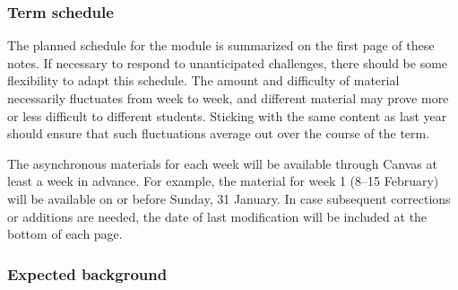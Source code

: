\subsubsection*{Term schedule}
The planned schedule for the module is summarized on the first page of these notes.
If necessary to respond to unanticipated challenges, there should be some flexibility to adapt this schedule.
The amount and difficulty of material necessarily fluctuates from week to week, and different material may prove more or less difficult to different students.
Sticking with the same content as last year should ensure that such fluctuations average out over the course of the term.

The asynchronous materials for each week will be available through Canvas at least a week in advance.
For example, the material for week 1 (8--15 February) will be available on or before Sunday, 31 January.
In case subsequent corrections or additions are needed, the date of last modification will be included at the bottom of each page.









\subsubsection*{Expected background}


